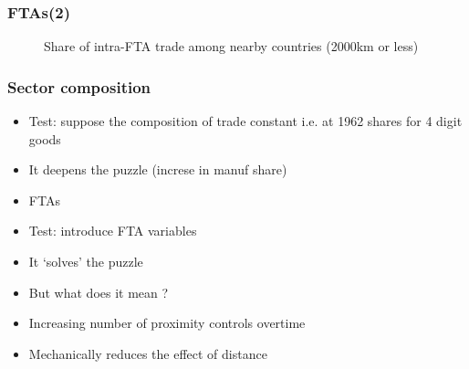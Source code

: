 \documentclass{beamer}
\begin{document}
\begin{frame}[plain]\frametitle{FTAs(2)}
\begin{figure}[h!]
\caption{Share of intra-FTA trade among nearby countries (2000km or less)
\label{fig:ftascontig}}
\begin{center}
\setlength{\fboxrule}{1pt} %
\setlength{\fboxsep}{.1in} %
\end{center}
\end{figure}
\end{frame}

\begin{frame}[plain]\frametitle{Sector composition}
\vspace{0.3cm}
\begin{itemize}
	\item Test: suppose the composition of trade constant i.e. at 1962 shares for 4 digit goods
	\item It deepens the puzzle (increse in manuf share)
\end{itemize}
\vspace{0.3cm}

\begin{itemize}
	\item FTAs
	\item Test: introduce FTA variables
	\item It `solves' the puzzle
	\item But what does it mean ? 
	\item Increasing number of proximity controls overtime 
	\item Mechanically reduces the effect of distance
\end{itemize}
\end{frame}
\end{document}
